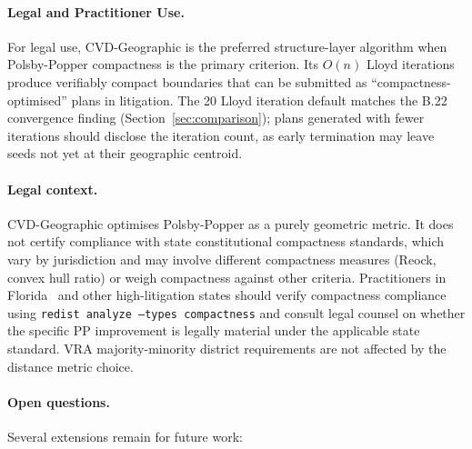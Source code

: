 \paragraph{Legal and Practitioner Use.}
For legal use, CVD-Geographic is the preferred structure-layer algorithm when
Polsby-Popper compactness is the primary criterion.
Its $O(n)$ Lloyd iterations produce verifiably compact boundaries that can be
submitted as ``compactness-optimised'' plans in litigation.
The 20 Lloyd iteration default matches the B.22 convergence finding
(Section~\ref{sec:comparison}); plans generated with fewer iterations should
disclose the iteration count, as early termination may leave seeds not yet
at their geographic centroid.

\paragraph{Legal context.} CVD-Geographic optimises Polsby-Popper as a purely geometric metric. It does not certify compliance with state constitutional compactness standards, which vary by jurisdiction and may involve different compactness measures (Reock, convex hull ratio) or weigh compactness against other criteria. Practitioners in Florida~\citep{floridaConst} and other high-litigation states should verify compactness compliance using \texttt{redist analyze --types compactness} and consult legal counsel on whether the specific PP improvement is legally material under the applicable state standard. VRA majority-minority district requirements are not affected by the distance metric choice.

\paragraph{Open questions.}
Several extensions remain for future work:

